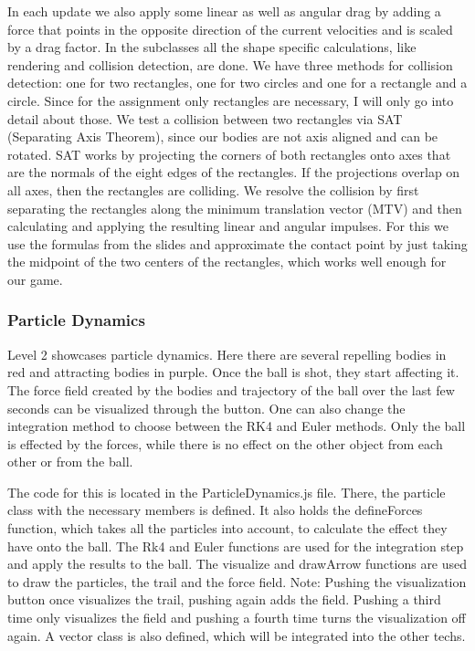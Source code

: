 \documentclass{article}
\begin{document}
In each update we also apply some linear as well as angular drag by adding a force that points in the opposite direction
of the current velocities and is scaled by a drag factor.
In the subclasses all the shape specific calculations, like rendering and collision detection, are done.
We have three methods for collision detection: one for two rectangles, one for two circles and one for 
a rectangle and a circle. 
Since for the assignment only rectangles are necessary, I will only go into detail about those. 
We test a collision between two rectangles via SAT (Separating Axis Theorem), since our bodies are not axis aligned and 
can be rotated. SAT works by projecting the corners of both rectangles onto axes that are the normals 
of the eight edges of the rectangles. If the projections overlap on all axes, then the rectangles are colliding.
We resolve the collision by first separating the rectangles along the minimum translation vector (MTV) and then 
calculating and applying the resulting linear and angular impulses.
For this we use the formulas from the slides and approximate the contact point by just taking the midpoint of the two centers of the rectangles, which
works well enough for our game.

\subsubsection{Particle Dynamics}
Level 2 showcases particle dynamics. Here there are several repelling bodies in red and attracting bodies in purple. Once the ball is shot, they start affecting it. The force field created by the bodies and trajectory of the ball over the last few seconds can be visualized through the button. One can also change the integration method to choose between the RK4 and Euler methods. Only the ball is effected by the forces, while there is no effect on the other object from each other or from the ball.  \newline

The code for this is located in the ParticleDynamics.js file. There, the particle class with the necessary members is defined. It also holds the defineForces function, which takes all the particles into account, to calculate the effect they have onto the ball. The Rk4 and Euler functions are used for the integration step and apply the results to the ball. The visualize and drawArrow functions are used to draw the particles, the trail and the force field. 
Note: Pushing the visualization button once visualizes the trail, pushing again adds the field. Pushing a third time only visualizes the field and pushing a fourth time turns the visualization off again. 
A vector class is also defined, which will be integrated into the other techs. 
\end{document}
